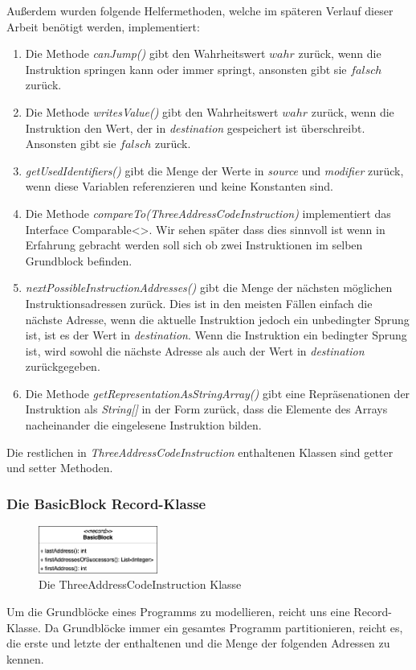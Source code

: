 \newpage
Außerdem wurden folgende Helfermethoden, welche im späteren Verlauf dieser Arbeit
benötigt werden, implementiert:
\begin{enumerate}
  \item Die Methode \textit{canJump()} gibt den Wahrheitswert $wahr$ zurück, wenn die
    Instruktion springen kann oder immer springt, ansonsten gibt sie $falsch$ zurück.
  \item Die Methode \textit{writesValue()} gibt den Wahrheitswert $wahr$ zurück,
    wenn die Instruktion den Wert, der in \textit{destination} gespeichert ist überschreibt.
    Ansonsten gibt sie $falsch$ zurück.
  \item \textit{getUsedIdentifiers()} gibt die Menge der Werte in \textit{source} und \textit{modifier} zurück,
    wenn diese Variablen referenzieren und keine Konstanten sind.
  \item Die Methode \textit{compareTo(ThreeAddressCodeInstruction)} implementiert das Interface
    Comparable<>. Wir sehen später dass dies sinnvoll ist wenn in Erfahrung gebracht werden
    soll sich ob zwei Instruktionen im selben Grundblock befinden.
  \item \textit{nextPossibleInstructionAddresses()} gibt die Menge der nächsten möglichen 
    Instruktionsadressen zurück. Dies ist in den meisten Fällen einfach die nächste
    Adresse, wenn die aktuelle Instruktion jedoch ein unbedingter Sprung ist, ist es der
    Wert in \textit{destination}. Wenn die Instruktion ein bedingter Sprung ist, wird sowohl die
    nächste Adresse als auch der Wert in \textit{destination} zurückgegeben.
  \item Die Methode \textit{getRepresentationAsStringArray()} gibt
    eine Repräsenationen der Instruktion als \textit{String[]} in der Form zurück, 
    dass die Elemente des Arrays nacheinander die eingelesene Instruktion bilden.
\end{enumerate}
Die restlichen in \textit{ThreeAddressCodeInstruction} enthaltenen Klassen sind getter und setter Methoden.

\subsubsection{Die BasicBlock Record-Klasse}
\begin{figure}
  \vspace{-15pt}
  \centering
  \includegraphics[width=0.35\textwidth]{fig/3AC_BasicBlock_methods.png}
  \caption{Die ThreeAddressCodeInstruction Klasse}
  \label{fig:BasicBlock}
\end{figure}
Um die Grundblöcke eines Programms zu modellieren, reicht uns eine Record-Klasse.
Da Grundblöcke immer ein gesamtes Programm partitionieren, reicht es, die erste und 
letzte der enthaltenen und die Menge der folgenden Adressen zu kennen.\\


